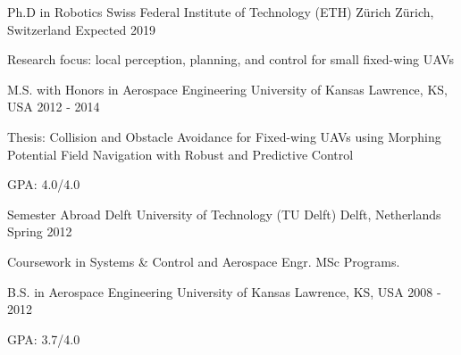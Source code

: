 

\begin{cventries}

  \cventry
    {Ph.D in Robotics} %
    {Swiss Federal Institute of Technology (ETH) Z\"{u}rich} %
    {Z\"{u}rich, Switzerland} %
    {Expected 2019} %
    {
      \begin{cvitems} %
        \item {Research focus: local perception, planning, and control for small fixed-wing UAVs}
      \end{cvitems}
    }
    
  \cventry
    {M.S. with Honors in Aerospace Engineering} %
    {University of Kansas} %
    {Lawrence, KS, USA} %
    {2012 - 2014} %
    {
      \begin{cvitems} %
		\item {Thesis: Collision and Obstacle Avoidance for Fixed-wing UAVs using Morphing Potential Field Navigation with Robust and Predictive Control}
        \item {GPA: 4.0/4.0}
      \end{cvitems}
    }
    
  \cventry
    {Semester Abroad} %
    {Delft University of Technology (TU Delft)} %
    {Delft, Netherlands} %
    {Spring 2012} %
    {
      \begin{cvitems} %
        \item {Coursework in Systems \& Control and Aerospace Engr. MSc Programs.}
      \end{cvitems}
    }
    
  \cventry
    {B.S. in Aerospace Engineering} %
    {University of Kansas} %
    {Lawrence, KS, USA} %
    {2008 - 2012} %
    {
      \begin{cvitems} %
        \item {GPA: 3.7/4.0}
      \end{cvitems}
    }
\end{cventries}
